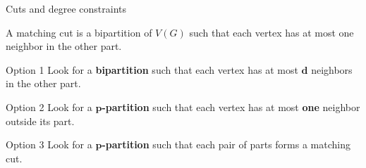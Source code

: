 \begin{frame}{Cuts and degree constraints}
    \begin{block}{}
        A matching cut is a bipartition of $V(G)$ such that each vertex has at most one neighbor in the other part.
    \end{block}
    \begin{block}{Option 1}
        Look for a \textbf{bipartition} such that each vertex has at most $\boldsymbol{d}$ neighbors in the other part.
    \end{block}
    \begin{block}{Option 2}
        Look for a \textbf{$\boldsymbol{p}$-partition} such that each vertex has at most \textbf{one} neighbor outside its part.
    \end{block}
    \begin{block}{Option 3}
        Look for a \textbf{$\boldsymbol{p}$-partition}  such that each pair of parts forms a matching cut.
    \end{block}
\end{frame}
